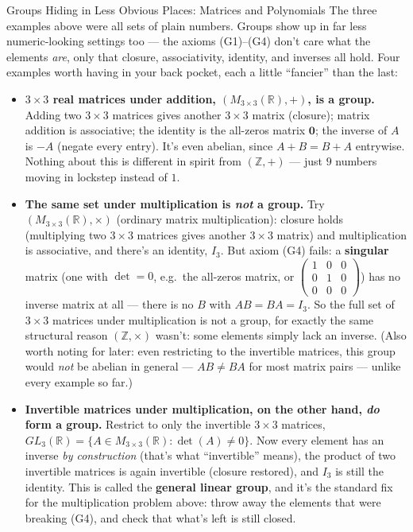 \begin{exbox}{Groups Hiding in Less Obvious Places: Matrices and Polynomials}
The three examples above were all sets of plain numbers. Groups show up in far less numeric-looking settings too --- the axioms (G1)--(G4) don't care what the elements \emph{are}, only that closure, associativity, identity, and inverses all hold. Four examples worth having in your back pocket, each a little ``fancier'' than the last:
\begin{itemize}[leftmargin=*]
  \item \textbf{$3\times 3$ real matrices under addition, $(M_{3\times 3}(\mathbb{R}), +)$, is a group.} Adding two $3\times 3$ matrices gives another $3\times 3$ matrix (closure); matrix addition is associative; the identity is the all-zeros matrix $\mathbf{0}$; the inverse of $A$ is $-A$ (negate every entry). It's even abelian, since $A+B=B+A$ entrywise. Nothing about this is different in spirit from $(\mathbb{Z},+)$ --- just $9$ numbers moving in lockstep instead of $1$.
  \item \textbf{The same set under multiplication is \emph{not} a group.} Try $(M_{3\times 3}(\mathbb{R}), \times)$ (ordinary matrix multiplication): closure holds (multiplying two $3\times3$ matrices gives another $3\times3$ matrix) and multiplication is associative, and there's an identity, $I_3$. But axiom (G4) fails: a \textbf{singular} matrix (one with $\det = 0$, e.g.\ the all-zeros matrix, or $\begin{pmatrix}1&0&0\\0&1&0\\0&0&0\end{pmatrix}$) has no inverse matrix at all --- there is no $B$ with $AB=BA=I_3$. So the full set of $3\times3$ matrices under multiplication is not a group, for exactly the same structural reason $(\mathbb{Z},\times)$ wasn't: some elements simply lack an inverse. (Also worth noting for later: even restricting to the invertible matrices, this group would \emph{not} be abelian in general --- $AB \ne BA$ for most matrix pairs --- unlike every example so far.)
  \item \textbf{Invertible matrices under multiplication, on the other hand, \emph{do} form a group.} Restrict to only the invertible $3\times 3$ matrices, $GL_3(\mathbb{R}) = \{A \in M_{3\times3}(\mathbb{R}) : \det(A)\ne 0\}$. Now every element has an inverse \emph{by construction} (that's what ``invertible'' means), the product of two invertible matrices is again invertible (closure restored), and $I_3$ is still the identity. This is called the \textbf{general linear group}, and it's the standard fix for the multiplication problem above: throw away the elements that were breaking (G4), and check that what's left is still closed.

\end{itemize}
\end{exbox}
